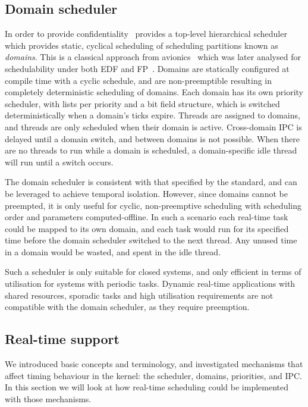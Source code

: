 \subsection{Domain scheduler}
\label{sec:sel4-domain-scheduler}

In order to provide confidentiality~\citep{Murray_MBGBSLGK_13} \selfour provides a top-level hierarchical scheduler
which provides static, cyclical scheduling of scheduling partitions known as \emph{domains}. This is
a classical approach from avionics~\citep{Lee_KYZ_98} which was later analysed for schedulability
under both \gls{EDF} and \gls{FP}~\citep{Mok_FC_01}.
Domains are statically configured at compile time with a cyclic schedule, and are non-preemptible
resulting in completely deterministic scheduling of domains.
Each domain has its own priority scheduler, with lists per priority and a bit field structure, which is switched deterministically when a domain's
ticks expire. 
Threads are assigned to domains, and threads are only scheduled when their domain is active.
Cross-domain \gls{IPC} is delayed until a domain switch, and \yield between domains is not
possible. When there are no threads to run while a domain is scheduled, a domain-specific idle thread will run until a switch occurs.

The domain scheduler is consistent with that specified by the \citet{ARINC653} standard, and 
can be leveraged to achieve temporal isolation. However, since domains cannot be
preempted, it is only useful for cyclic, non-preemptive scheduling with scheduling order and
parameters computed-offline.
In such a scenario each real-time task could be mapped to its own domain, and each task would run for its specified time before the domain scheduler switched to the next thread.
Any unused time in a domain would be wasted, and spent in the idle thread.

Such a scheduler is only suitable for closed systems, and only efficient in terms of utilisation for systems with periodic tasks. 
Dynamic real-time applications with shared resources, sporadic tasks and high utilisation
requirements are not compatible
with the domain scheduler, as they require preemption.

\subsection{Real-time support}

We introduced basic \selfour concepts and terminology, and investigated mechanisms that affect
timing behaviour in the kernel: the scheduler, domains, priorities, \yield and IPC. 
In this section we will look at how real-time scheduling could be implemented with those mechanisms.

